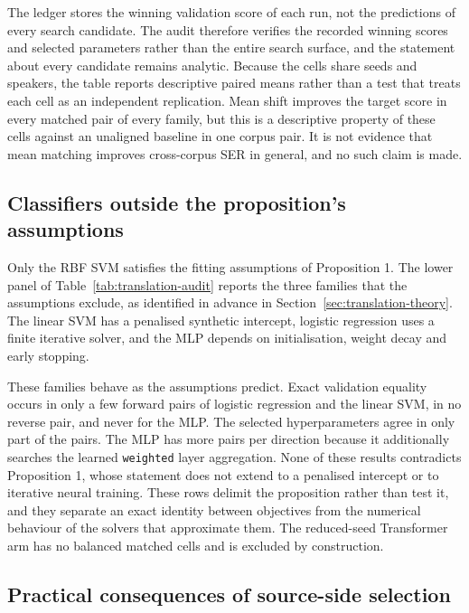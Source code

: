 The ledger stores the winning validation score of each run, not the
predictions of every search candidate. The audit therefore verifies the
recorded winning scores and selected parameters rather than the entire search
surface, and the statement about every candidate remains analytic. Because the
cells share seeds and speakers, the table reports descriptive paired means
rather than a test that treats each cell as an independent replication. Mean
shift improves the target score in every matched pair of every family, but this
is a descriptive property of these cells against an unaligned baseline in one
corpus pair. It is not evidence that mean matching improves cross-corpus SER in
general, and no such claim is made.

\subsection{Classifiers outside the proposition's assumptions}
\label{sec:results-boundary}

Only the RBF SVM satisfies the fitting assumptions of Proposition 1. The lower
panel of Table~\ref{tab:translation-audit} reports the three families that the
assumptions exclude, as identified in advance in
Section~\ref{sec:translation-theory}. The linear SVM has a penalised synthetic
intercept, logistic regression uses a finite iterative solver, and the MLP
depends on initialisation, weight decay and early stopping.

These families behave as the assumptions predict. Exact validation equality
occurs in only a few forward pairs of logistic regression and the linear SVM,
in no reverse pair, and never for the MLP. The selected hyperparameters agree
in only part of the pairs. The MLP has more pairs per direction because it
additionally searches the learned \texttt{weighted} layer aggregation. None of
these results contradicts Proposition 1, whose statement does not extend to a
penalised intercept or to iterative neural training. These rows delimit the
proposition rather than test it, and they separate an exact identity between
objectives from the numerical behaviour of the solvers that approximate them.
The reduced-seed Transformer arm has no balanced matched cells and is excluded
by construction.

\subsection{Practical consequences of source-side selection}
\label{sec:results-selection}

